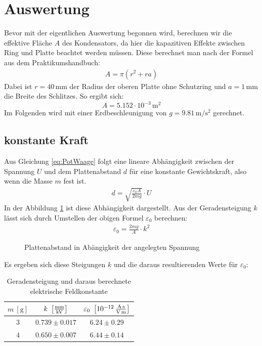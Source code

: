 \documentclass[12pt,a4paper,titlepage,headinclude,bibtotoc]{scrartcl}
\begin{document}
\section{Auswertung}
\label{sec:auswertung}
Bevor mit der eigentlichen Auswertung begonnen wird, berechnen wir die effektive Fläche $A$ des Kondensators, da hier die kapazitiven Effekte zwischen Ring und Platte beachtet werden müssen.
Diese berechnet man nach der Formel aus dem Praktikumshandbuch:
\begin{align*}
 A=\pi (r^2+ra)
\end{align*}
Dabei ist $r=40\,$mm der Radius der oberen Platte ohne Schutzring und $a=1\,$mm die Breite des Schlitzes.
So ergibt sich: $$A=5.152 \cdot 10^{-3}\,\si{\meter^2}$$
Im Folgenden wird mit einer Erdbeschleunigung von $g=9.81\,\si{\meter\per\second^2}$ gerechnet.

\subsection{konstante Kraft}
Aus Gleichung \eqref{eq:PotWaage} folgt eine lineare Abhängigkeit zwischen der Spannung $U$ und dem Plattenabstand $d$ für eine konstante Gewichtskraft, also wenn die Masse $m$ fest ist.
\begin{align}
 d= \sqrt{\frac{\varepsilon_0 A}{2mg}} \cdot U
\end{align}
In der Abbildung \ref{fig:d(U)} ist diese Abhängigkeit dargestellt.
Aus der Geradensteigung $k$ lässt sich durch Umstellen der obigen Formel $\varepsilon_0$ berechnen:
\begin{align*}
 \varepsilon_0=\frac{2mg}{A}\cdot k^2
\end{align*}

\begin{figure}[!htb]
 \centering
 
 \caption{Plattenabstand in Abängigkeit der angelegten Spannung}
 \label{fig:d(U)}
\end{figure}
Es ergeben sich diese Steigungen $k$ und die daraus resultierenden Werte für $\varepsilon_0$:
\begin{table}[!htb]
 \centering
 \begin{tabular}{|c|c|c|}
  \hline
  \rule{0pt}{15pt}$m~[\si{\gram}]$&  $k~\left[\si[per-mode=fraction]{\milli\meter\per\kilo\volt}\right]$ & $\varepsilon_0~\left[10^{-12}\,\si[per-mode=fraction]{\ampere\second\per\volt\per\meter}\right]$\\
  \hline
  $3$ & $0.739\pm 0.017$ & $6.24 \pm 0.29$\\
  $4$ & $0.650\pm 0.007$ & $6.44 \pm 0.14$\\
  \hline
 \end{tabular}
 \caption{Geradensteigung und daraus berechnete elektrische Feldkonstante}
 \label{tab:messung1_k_epsilon0}
\end{table}
\end{document}
